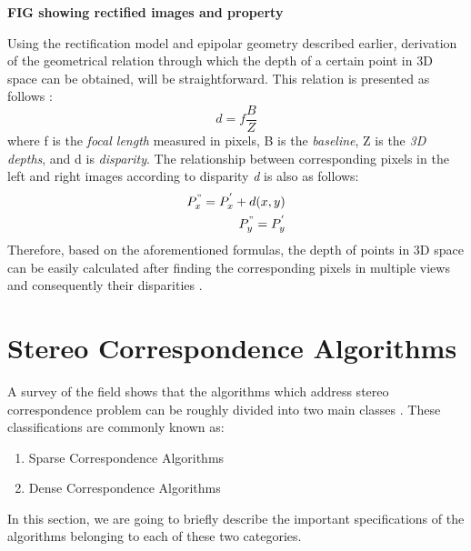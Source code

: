 \documentclass[12pt]{report}
\begin{document}
\textbf{FIG showing rectified images and property}


Using the rectification model and epipolar geometry described earlier, 
derivation of the geometrical relation through which the depth of a certain point in 3D space 
can be obtained, will be straightforward. This relation is presented as follows \cite{sze11}:
\begin{equation}
d = f\frac{B}{Z}
\end{equation}
where f is the {\it focal length} measured in pixels, B is the {\it baseline}, Z is the {\it 3D depths}, and d is {\it disparity}. The relationship between corresponding pixels in the left
and right images according to disparity {\it d} is also as follows:
\begin{align}
{P}^{"}_{x}={P}^{'}_{x}+d(x,y) \\
{P}^{"}_{y} = {P}^{'}_{y}
\end{align}
Therefore, based on the aforementioned formulas, the depth of points in 3D space can be easily calculated after finding the corresponding pixels in multiple views and consequently their
disparities \cite{bol87,oku93,sch02}.

\section{Stereo Correspondence Algorithms}
A survey of the field shows that the algorithms which address stereo correspondence problem can be roughly divided into two main classes \cite{sch02}. These classifications are commonly known as:
\begin{enumerate}
\item Sparse Correspondence Algorithms
\item Dense Correspondence Algorithms 
\end{enumerate}

In this section, we are going to briefly describe the important specifications of the algorithms belonging to each of these two categories.
\end{document}
